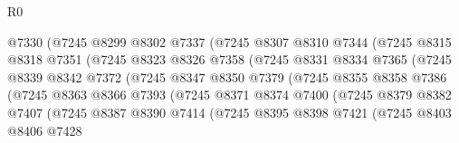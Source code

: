\begin{lexlean}{R0}
\begin{coremodule}
                          @7330
                          (@7245
                            @8299
                            @8302
                            @7337
                            (@7245
                              @8307
                              @8310
                              @7344
                              (@7245
                                @8315
                                @8318
                                @7351
                                (@7245
                                  @8323
                                  @8326
                                  @7358
                                  (@7245
                                    @8331
                                    @8334
                                    @7365
                                    (@7245
                                      @8339
                                      @8342
                                      @7372
                                      (@7245
                                        @8347
                                        @8350
                                        @7379
                                        (@7245
                                          @8355
                                          @8358
                                          @7386
                                          (@7245
                                            @8363
                                            @8366
                                            @7393
                                            (@7245
                                              @8371
                                              @8374
                                              @7400
                                              (@7245
                                                @8379
                                                @8382
                                                @7407
                                                (@7245
                                                  @8387
                                                  @8390
                                                  @7414
                                                  (@7245
                                                    @8395
                                                    @8398
                                                    @7421
                                                    (@7245
                                                      @8403
                                                      @8406
                                                      @7428

\end{coremodule}
\end{lexlean}
